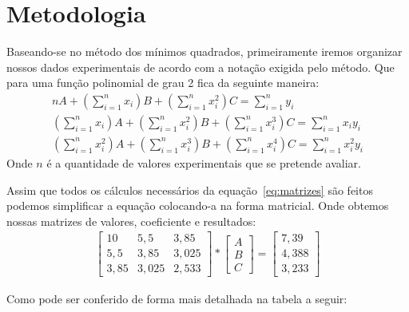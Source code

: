 \documentclass[12pt, hidelinks]{article}
\begin{document}
\section{Metodologia}

Baseando-se no método dos mínimos quadrados, primeiramente iremos organizar nossos dados experimentais de acordo com a notação exigida pelo
método. Que para uma função polinomial de grau 2 fica da seguinte maneira:
\begin{eqnarray}\label{eq:matrizes}
    nA + \left(\sum\limits_{i=1}^{n}x_i\right)B + \left(\sum\limits_{i=1}^{n}x_i^2\right)C = \sum\limits_{i=1}^{n}y_i \nonumber\\
    \left(\sum\limits_{i=1}^{n}x_i\right)A + \left(\sum\limits_{i=1}^{n}x_i^2\right)B + \left(\sum\limits_{i=1}^{n}x_i^3\right)C = \sum\limits_{i=1}^{n}x_iy_i \\
    \left(\sum\limits_{i=1}^{n}x_i^2\right)A + \left(\sum\limits_{i=1}^{n}x_i^3\right)B + \left(\sum\limits_{i=1}^{n}x_i^4\right)C = \sum\limits_{i=1}^{n}x_i^2y_i\nonumber
\end{eqnarray}
Onde $n$ é a quantidade de valores experimentais que se pretende avaliar.

Assim que todos os cálculos necessários da equação~\eqref{eq:matrizes} são feitos podemos simplificar a equação colocando-a na forma matricial.
Onde obtemos nossas matrizes de valores, coeficiente e resultados:
\begin{eqnarray}\label{eq:sistema}
\left[\begin{array}{rrr}
10   & 5,5    & 3,85\\
5,5  & 3,85   & 3,025\\
3,85 & 3,025  & 2,533
\end{array}\right] *
\left[\begin{array}{r}
A\\B\\C
\end{array}\right] =
\left[\begin{array}{r}
7,39\\4,388\\3,233
\end{array}\right]
\end{eqnarray}

Como pode ser conferido de forma mais detalhada na tabela a seguir:
\end{document}
